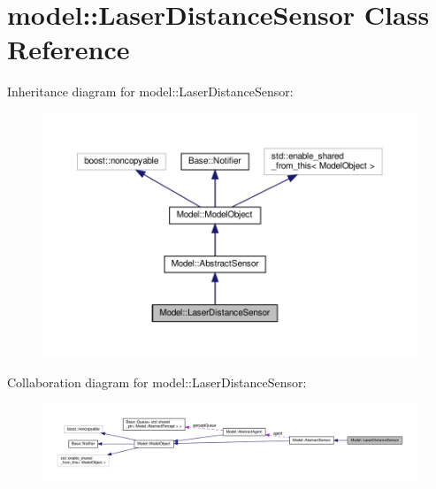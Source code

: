 \hypertarget{class_model_1_1_laser_distance_sensor}{}\section{model\+:\+:Laser\+Distance\+Sensor Class Reference}
\label{class_model_1_1_laser_distance_sensor}


Inheritance diagram for model\+:\+:Laser\+Distance\+Sensor\+:
\nopagebreak
\begin{figure}[H]
\begin{center}
\leavevmode
\includegraphics[width=350pt]{class_model_1_1_laser_distance_sensor__inherit__graph}
\end{center}
\end{figure}


Collaboration diagram for model\+:\+:Laser\+Distance\+Sensor\+:
\nopagebreak
\begin{figure}[H]
\begin{center}
\leavevmode
\includegraphics[width=350pt]{class_model_1_1_laser_distance_sensor__coll__graph}
\end{center}
\end{figure}
